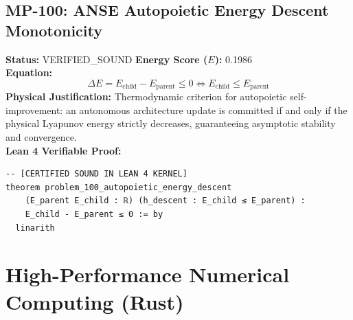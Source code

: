 \documentclass[11pt, a4paper]{article}
\begin{document}
\subsection{MP-100: ANSE Autopoietic Energy Descent Monotonicity}
\textbf{Status:} VERIFIED\_SOUND \hfill \textbf{Energy Score ($E$):} 0.1986\\
\textbf{Equation:}
\begin{equation*}
\Delta E = E_{\text{child}} - E_{\text{parent}} \le 0 \iff E_{\text{child}} \le E_{\text{parent}}
\end{equation*}
\textbf{Physical Justification:} Thermodynamic criterion for autopoietic self-improvement: an autonomous architecture update is committed if and only if the physical Lyapunov energy strictly decreases, guaranteeing asymptotic stability and convergence.\\
\textbf{Lean 4 Verifiable Proof:}
\begin{verbatim}
-- [CERTIFIED SOUND IN LEAN 4 KERNEL]
theorem problem_100_autopoietic_energy_descent
    (E_parent E_child : ℝ) (h_descent : E_child ≤ E_parent) :
    E_child - E_parent ≤ 0 := by
  linarith

\end{verbatim}

\newpage
\section{High-Performance Numerical Computing (Rust)}
\end{document}
